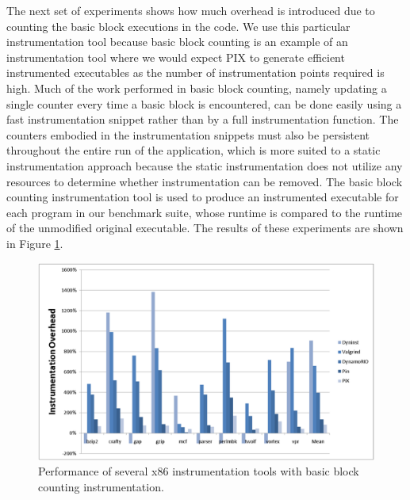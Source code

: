 The next set of experiments shows how much overhead is introduced due to counting the
basic block executions in the code. We use this particular instrumentation tool because basic block counting
is an example of an instrumentation tool where we would expect PIX to generate efficient instrumented executables
as the number of instrumentation points required is high. Much of the work performed in basic block counting, namely updating a single
counter every time a basic block is encountered, can be done easily using a fast instrumentation snippet rather than
by a full instrumentation function. The counters embodied in the instrumentation snippets must also be
persistent throughout the entire run of the application, which is more suited to a static instrumentation approach
because the static instrumentation does not utilize any resources to determine whether instrumentation can be removed.
The basic block counting instrumentation tool is used to produce an instrumented
executable for each program in our benchmark suite, whose runtime is compared to the runtime of the 
unmodified original executable. The results of these experiments are shown in Figure \ref{Figure:ToolOverheads}. 

\begin{figure}[ht]
\centering
\label{Figure:ToolOverheads}
\includegraphics[scale=0.5]{bbcount.eps}
\caption{Performance of several x86 instrumentation tools with basic block counting instrumentation.}
\end{figure}

